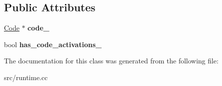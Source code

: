 \subsection*{Public Attributes}
\begin{DoxyCompactItemize}
\item 
\hypertarget{classv8_1_1internal_1_1_activations_finder_ac6ed1ea07a59270aae7aaf32f23cb537}{}\hyperlink{classv8_1_1internal_1_1_code}{Code} $\ast$ {\bfseries code\+\_\+}\label{classv8_1_1internal_1_1_activations_finder_ac6ed1ea07a59270aae7aaf32f23cb537}

\item 
\hypertarget{classv8_1_1internal_1_1_activations_finder_a0faceafe43a03036d7d86c6aaf231fdf}{}bool {\bfseries has\+\_\+code\+\_\+activations\+\_\+}\label{classv8_1_1internal_1_1_activations_finder_a0faceafe43a03036d7d86c6aaf231fdf}

\end{DoxyCompactItemize}


The documentation for this class was generated from the following file\+:\begin{DoxyCompactItemize}
\item 
src/runtime.\+cc\end{DoxyCompactItemize}
